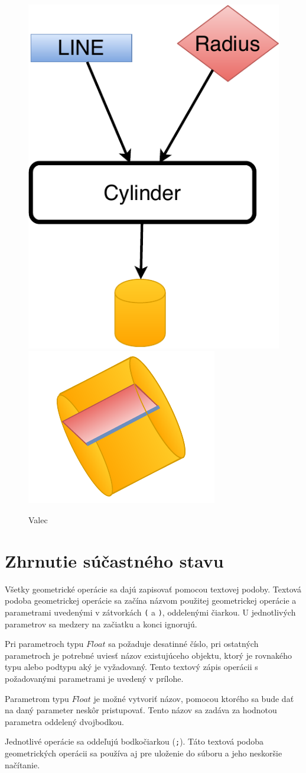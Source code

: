 \begin{figure}[H]
	\centering
	\includegraphics[height=0.3\textwidth]{obrazky-figures/Diagram/Volumetric/DP Navrh operacii-3D - ObjectsCylinder.pdf}
	\includegraphics[height=0.3\textwidth]{obrazky-figures/Diagram/Draw/4Object/DP Navrh operacii-3D - ObjectsCylinder.pdf}
	\caption{Valec}
	\label{fig:ObjectsCylinder}
\end{figure}


\chapter{Zhrnutie súčastného stavu}
Všetky geometrické operácie sa dajú zapisovať pomocou textovej podoby. 
Textová podoba geometrickej operácie sa začína názvom použitej geometrickej operácie a parametrami uvedenými v zátvorkách \texttt{(} a \texttt{)}, oddelenými čiarkou. U jednotlivých parametrov sa medzery na začiatku a konci ignorujú.

Pri parametroch typu $Float$ sa požaduje desatinné číslo, pri ostatných parametroch je potrebné uviesť názov existujúceho objektu, ktorý je rovnakého typu alebo podtypu aký je vyžadovaný. Tento textový zápis operácii s požadovanými parametrami je uvedený v prílohe.

Parametrom typu $Float$ je možné vytvoriť názov, pomocou ktorého sa bude dať na daný parameter neskôr pristupovať. 
Tento názov sa zadáva za hodnotou parametra oddelený dvojbodkou.

Jednotlivé operácie sa oddeľujú bodkočiarkou (\texttt{;}). 
Táto textová podoba geometrických operácii sa používa aj pre uloženie do súboru a jeho neskoršie načítanie. 


